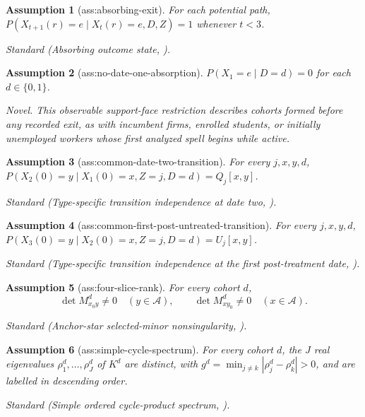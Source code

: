 \documentclass{article}
\newtheorem{assumption}{Assumption}
\begin{document}
\begin{assumption}[ass:absorbing-exit]\label{ass:absorbing-exit}
For each potential path, \(P(X_{t+1}(r)=e\mid X_t(r)=e,D,Z)=1\) whenever \(t<3\).
\par\smallskip\noindent\emph{Standard} (Absorbing outcome state, \cite{DeanerKu2026DurationDiD}).
\end{assumption}

\begin{assumption}[ass:no-date-one-absorption]\label{ass:no-date-one-absorption}
\(P(X_1=e\mid D=d)=0\) for each \(d\in\{0,1\}\).
\par\smallskip\noindent\emph{Novel.} This observable support-face restriction describes cohorts formed before any recorded exit, as with incumbent firms, enrolled students, or initially unemployed workers whose first analyzed spell begins while active.
\end{assumption}

\begin{assumption}[ass:common-date-two-transition]\label{ass:common-date-two-transition}
For every \(j,x,y,d\), \(P(X_2(0)=y\mid X_1(0)=x,Z=j,D=d)=Q_j[x,y]\).
\par\smallskip\noindent\emph{Standard} (Type-specific transition independence at date two, \cite{AhnKasahara2026TransitionIndependence}).
\end{assumption}

\begin{assumption}[ass:common-first-post-untreated-transition]\label{ass:common-first-post-untreated-transition}
For every \(j,x,y,d\), \(P(X_3(0)=y\mid X_2(0)=x,Z=j,D=d)=U_j[x,y]\).
\par\smallskip\noindent\emph{Standard} (Type-specific transition independence at the first post-treatment date, \cite{AhnKasahara2026TransitionIndependence}).
\end{assumption}

\begin{assumption}[ass:four-slice-rank]\label{ass:four-slice-rank}
For every cohort \(d\),
\[
 \det M_{x_0y}^d\neq0\quad(y\in\mathcal A),
 \qquad
 \det M_{xy_0}^d\neq0\quad(x\in\mathcal A).
\]
\par\smallskip\noindent\emph{Standard} (Anchor-star selected-minor nonsingularity, \cite{AhnKasahara2026TransitionIndependence}).
\end{assumption}

\begin{assumption}[ass:simple-cycle-spectrum]\label{ass:simple-cycle-spectrum}
For every cohort \(d\), the \(J\) real eigenvalues \(\rho_1^d,\ldots,\rho_J^d\) of \(K^d\) are distinct, with \(g^d=\min_{j\neq k}|\rho_j^d-\rho_k^d|>0\), and are labelled in descending order.
\par\smallskip\noindent\emph{Standard} (Simple ordered cycle-product spectrum, \cite{AhnKasahara2026TransitionIndependence}).
\end{assumption}
\end{document}
